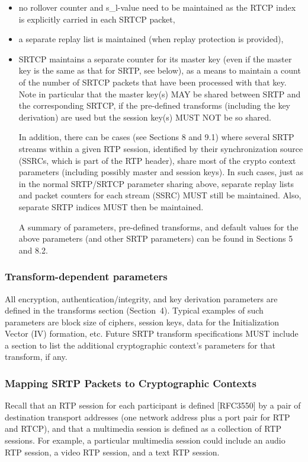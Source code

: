 \documentclass{article}
\begin{document}
\begin{itemize}
\item no rollover counter and s\_l-value need to be maintained as the RTCP index is explicitly carried in each SRTCP packet,
\item a separate replay list is maintained (when replay protection is provided),
\item SRTCP maintains a separate counter for its master key (even if the master key is the same as that for SRTP, see below), as a means to maintain a count of the number of SRTCP packets that have been processed with that key.
Note in particular that the master key(s) MAY be shared between SRTP and the corresponding SRTCP, if the pre-defined transforms (including the key derivation) are used but the session key(s) MUST NOT be so shared.

In addition, there can be cases (see Sections 8 and 9.1) where several SRTP streams within a given RTP session, identified by their synchronization source (SSRCs, which is part of the RTP header), share most of the crypto context parameters (including possibly master and session keys).  In such cases, just as in the normal SRTP/SRTCP parameter sharing above, separate replay lists and packet counters for each stream (SSRC) MUST still be maintained.  Also, separate SRTP indices MUST then be maintained.

A summary of parameters, pre-defined transforms, and default values for the above parameters (and other SRTP parameters) can be found in Sections 5 and 8.2.

\end{itemize}
\subsubsection{Transform-dependent parameters}

All encryption, authentication/integrity, and key derivation parameters are defined in the transforms section (Section~4). Typical examples of such parameters are block size of ciphers, session keys, data for the Initialization Vector (IV) formation, etc. Future SRTP transform specifications MUST include a section to list the additional cryptographic context's parameters for that transform, if any.

\subsubsection{Mapping SRTP Packets to Cryptographic Contexts}

Recall that an RTP session for each participant is defined [RFC3550] by a pair of destination transport addresses (one network address plus a port pair for RTP and RTCP), and that a multimedia session is defined as a collection of RTP sessions.  For example, a particular multimedia session could include an audio RTP session, a video RTP session, and a text RTP session.
\end{document}
